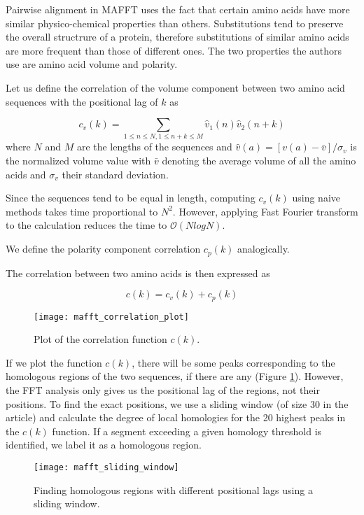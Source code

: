 Pairwise alignment in MAFFT uses the fact that certain amino acids have more similar physico-chemical properties than others. Substitutions tend to preserve the
overall structrure of a protein, therefore substitutions of similar amino acids are more frequent than those of different ones. The two properties
the authors use are amino acid volume and polarity.

Let us define the correlation of the volume component between two amino acid sequences with the positional lag of $k$ as

\[
    c_v(k) = \sum_{1\leq n \leq N, 1 \leq n+k \leq M} \hat{v}_1(n) \hat{v}_2(n+k)
\]
where $N$ and $M$ are the lengths of the sequences and $\hat{v}(a) = [v(a) - \bar{v}] / \sigma_v$ is the normalized volume value with $\bar{v}$
denoting the average volume of all the amino acids and $\sigma_v$ their standard deviation.

Since the sequences tend to be equal in length, computing $c_v(k)$ using naive methods takes time proportional to $N^2$. However, applying Fast Fourier
transform to the calculation reduces the time to $\mathcal{O}(N log N)$.

We define the polarity component correlation $c_p(k)$ analogically.

The correlation between two amino acids is then expressed as 

\[
    c(k) = c_v(k) + c_p(k)
\]

\begin{figure}[h]
\centering
\texttt{[image: mafft\_correlation\_plot]}
\caption{Plot of the correlation function $c(k)$. \citep[Figure~1A]{mafft}}
\label{fig:mafft1}
\end{figure}

If we plot the function $c(k)$, there will be some peaks corresponding to the homologous regions of the two sequences, if there are any (Figure \ref{fig:mafft1}). However, the FFT
analysis only gives us the positional lag of the regions, not their positions. To find the exact positions, we use a sliding window (of size 30 in the article)
and calculate the degree of local homologies for the 20 highest peaks in the $c(k)$ function. If a segment exceeding a given homology threshold is identified,
we label it as a homologous region.

\begin{figure}[h]
\centering
\texttt{[image: mafft\_sliding\_window]}
\caption{Finding homologous regions with different positional lags using a sliding window. \citep[Figure~1B]{mafft}}
\label{fig:mafft2}
\end{figure}

